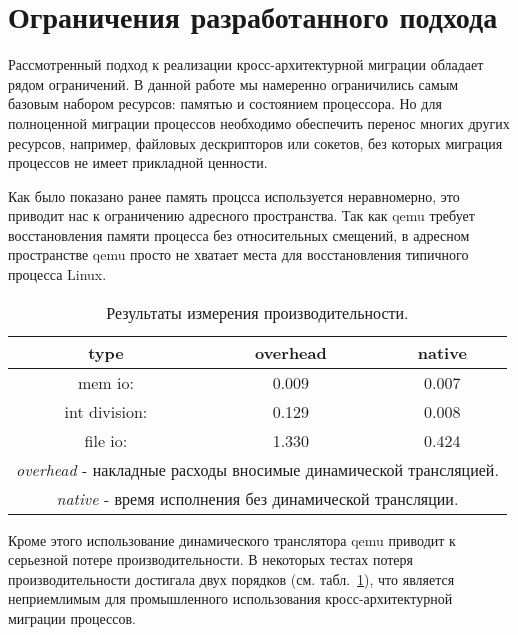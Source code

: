 \section{Ограничения разработанного подхода}

Рассмотренный подход к реализации кросс-архитектурной миграции обладает рядом ограничений. В данной работе мы намеренно ограничились самым базовым набором ресурсов: памятью и состоянием процессора. Но для полноценной миграции процессов необходимо обеспечить перенос многих других ресурсов, например, файловых дескрипторов или сокетов, без которых миграция процессов не имеет прикладной ценности.

Как было показано ранее память процсса используется неравномерно, это приводит нас к ограничению адресного пространства. Так как qemu требует восстановления памяти процесса без относительных смещений, в адресном пространстве qemu просто не хватает места для восстановления типичного процесса Linux.

\begin{table}[h]
  \begin{center}
    \begin{tabularx}{\linewidth}{|c|c|c|}
      \hline
      type                      & overhead & native \\
      \hline
      mem io:                   & 0.009    & 0.007  \\
      int division:             & 0.129    & 0.008  \\
      file io:                  & 1.330    & 0.424  \\
      \hline
      \multicolumn{3}{|X|}{\emph{overhead} - накладные расходы вносимые динамической трансляцией.} \\
      \multicolumn{3}{|X|}{\emph{native} - время исполнения без динамической трансляции.} \\
      \hline
    \end{tabularx}
  \end{center}
  \caption{\label{tab:perf}Результаты измерения производительности.}
\end{table}

Кроме этого использование динамического транслятора qemu приводит к серьезной потере производительности. В некоторых тестах потеря производительности достигала двух порядков (см. табл.~\ref{tab:perf}), что является неприемлимым для промышленного использования кросс-архитектурной миграции процессов.
